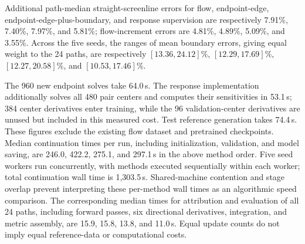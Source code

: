 Additional path-median straight-screenline errors for flow, endpoint-edge, endpoint-edge-plus-boundary, and response supervision are respectively 7.91\%, 7.40\%, 7.97\%, and 5.81\%; flow-increment errors are 4.81\%, 4.89\%, 5.09\%, and 3.55\%. Across the five seeds, the ranges of mean boundary errors, giving equal weight to the 24 paths, are respectively $[13.36,24.12]\%$, $[12.29,17.69]\%$, $[12.27,20.58]\%$, and $[10.53,17.46]\%$.

The 960 new endpoint solves take 64.0\,s. The response implementation additionally solves all 480 pair centers and computes their sensitivities in 53.1\,s; 384 center derivatives enter training, while the 96 validation-center derivatives are unused but included in this measured cost. Test reference generation takes 74.4\,s. These figures exclude the existing flow dataset and pretrained checkpoints. Median continuation times per run, including initialization, validation, and model saving, are 246.0, 422.2, 275.1, and 297.1\,s in the above method order. Five seed workers run concurrently, with methods executed sequentially within each worker; total continuation wall time is 1,303.5\,s. Shared-machine contention and stage overlap prevent interpreting these per-method wall times as an algorithmic speed comparison. The corresponding median times for attribution and evaluation of all 24 paths, including forward passes, six directional derivatives, integration, and metric assembly, are 15.9, 15.8, 13.8, and 11.0\,s. Equal update counts do not imply equal reference-data or computational costs.
